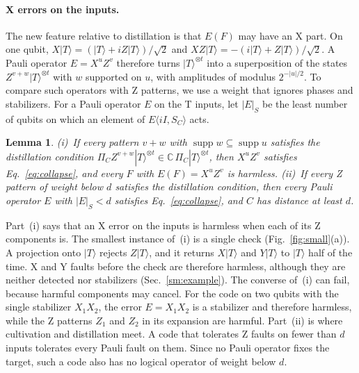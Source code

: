 \documentclass[aps,prl,reprint,twocolumn,amsmath,amssymb,floatfix,nofootinbib,superscriptaddress]{revtex4-2}
\newtheorem{lemma}[theorem]{Lemma}
\theoremstyle{definition}
\theoremstyle{remark}
\begin{document}
\paragraph*{X errors on the inputs.}
The new feature relative to distillation is that $E(F)$ may have an X part. On one qubit, $X|T\rangle=(|T\rangle+iZ|T\rangle)/\sqrt2$ and $XZ|T\rangle=-(i|T\rangle+Z|T\rangle)/\sqrt2$. A Pauli operator $E=X^uZ^v$ therefore turns $|T\rangle^{\otimes t}$ into a superposition of the states $Z^{v+w}|T\rangle^{\otimes t}$ with $w$ supported on $u$, with amplitudes of modulus $2^{-|u|/2}$. To compare such operators with Z patterns, we use a weight that ignores phases and stabilizers. For a Pauli operator $E$ on the T inputs, let $|E|_S$ be the least number of qubits on which an element of $E\langle iI,S_C\rangle$ acts.
\begin{lemma}\label{lem:shadow}
(i)~If every pattern $v+w$ with $\operatorname{supp}w\subseteq\operatorname{supp}u$ satisfies the distillation condition $\Pi_CZ^{v+w}|T\rangle^{\otimes t}\in\mathbb C\,\Pi_C|T\rangle^{\otimes t}$, then $X^uZ^v$ satisfies Eq.~\eqref{eq:collapse}, and every $F$ with $E(F)=X^uZ^v$ is harmless. (ii)~If every Z pattern of weight below $d$ satisfies the distillation condition, then every Pauli operator $E$ with $|E|_S<d$ satisfies Eq.~\eqref{eq:collapse}, and $C$ has distance at least $d$.
\end{lemma}
Part~(i) says that an X error on the inputs is harmless when each of its Z components is. The smallest instance of~(i) is a single check (Fig.~\ref{fig:small}(a)). A projection onto $|T\rangle$ rejects $Z|T\rangle$, and it returns $X|T\rangle$ and $Y|T\rangle$ to $|T\rangle$ half of the time. X and Y faults before the check are therefore harmless, although they are neither detected nor stabilizers (Sec.~\ref{sm:example}). The converse of~(i) can fail, because harmful components may cancel. For the code on two qubits with the single stabilizer $X_1X_2$, the error $E=X_1X_2$ is a stabilizer and therefore harmless, while the Z patterns $Z_1$ and $Z_2$ in its expansion are harmful. Part~(ii) is where cultivation and distillation meet. A code that tolerates Z faults on fewer than $d$ inputs tolerates every Pauli fault on them. Since no Pauli operator fixes the target, such a code also has no logical operator of weight below $d$.
\end{document}
